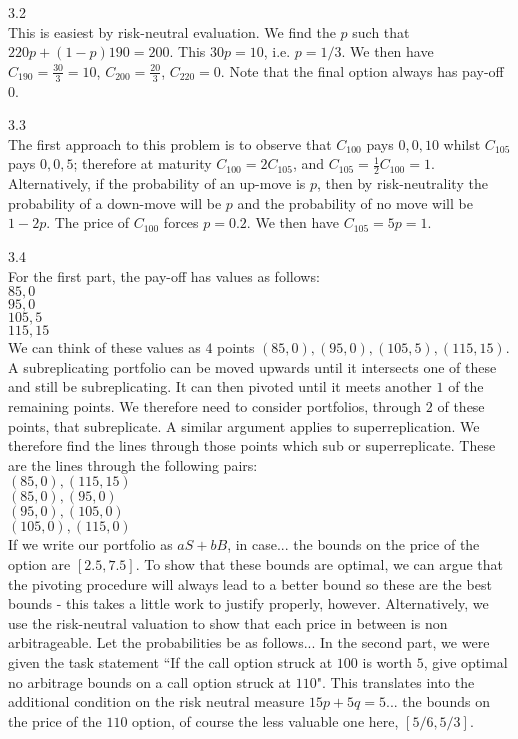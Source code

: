 3.2 \\
This is easiest by risk-neutral evaluation. We find the $p$ such that $220p+(1-p)190=200$. This $30p=10$, i.e. $p=1/3$. We then have $C_{190}=\frac{30}{3}=10$, $C_{200}=\frac{20}{3}$, $C_{220}=0$. Note that the final option always has pay-off $0$.

3.3 \\
The first approach to this problem is to observe that $C_{100}$ pays $0,0,10$ whilst $C_{105}$ pays $0,0,5$; therefore at maturity $C_{100}=2C_{105}$, and $C_{105}=\frac{1}{2}C_{100}=1$. Alternatively, if the probability of an up-move is $p$, then by risk-neutrality the probability of a down-move will be $p$ and the probability of no move will be $1-2p$. The price of $C_{100}$ forces $p=0.2$. We then have $C_{105}=5p=1$.

3.4 \\
For the first part, the pay-off has values as follows: \\
$85,0$ \\
$95,0$ \\
$105,5$ \\
$115,15$ \\
We can think of these values as $4$ points $(85,0),(95,0),(105,5),(115,15)$. A subreplicating portfolio can be moved upwards until it intersects one of these and still be subreplicating. It can then pivoted until it meets another $1$ of the remaining points. We therefore need to consider portfolios, through $2$ of these points, that subreplicate. A similar argument applies to superreplication. We therefore find the lines through those points which sub or superreplicate. These are the lines through the following pairs: \\
$(85,0),(115,15)$ \\
$(85,0),(95,0)$ \\
$(95,0),(105,0)$ \\
$(105,0),(115,0)$ \\
If we write our portfolio as $aS+bB$, in case... the bounds on the price of the option are $\boxed{[2.5,7.5]}$. To show that these bounds are optimal, we can argue that the pivoting procedure will always lead to a better bound so these are the best bounds - this takes a little work to justify properly, however. Alternatively, we use the risk-neutral valuation to show that each price in between is non arbitrageable. Let the probabilities be as follows... In the second part, we were given the task statement ``If the call option struck at $100$ is worth $5$, give optimal no arbitrage bounds on a call option struck at $110$". This translates into the additional condition on the risk neutral measure $15p+5q=5$... the bounds on the price of the $110$ option, of course the less valuable one here, $\boxed{[5/6,5/3]}$.

